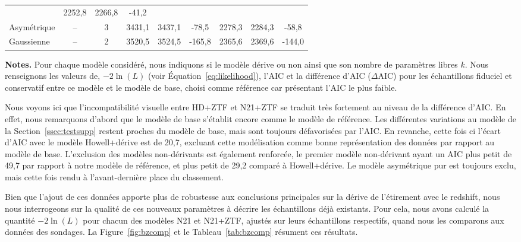 \documentclass[../main/main.tex]{subfiles}
\begin{document}
\begin{landscape}
\begin{table}[p]
\begin{threeparttable}
{\begin{tabular}{lcccccccc}
            & 2252,8 & 2266,8 & -41,2 \\
            Asymétrique & -- & 3
            & 3431,1 & 3437,1 & -78,5
            & 2278,3 & 2284,3 & -58,8 \\
            Gaussienne & -- & 2
            & 3520,5 & 3524,5 & -165,8
            & 2365,6 & 2369,6 & -144,0 \\
            \bottomrule
        \end{tabular}}
        \begin{tablenotes}[flushleft]
            \item\small \textbf{\hspace{-3.2pt}Notes.} Pour chaque modèle
                considéré, nous indiquons si le modèle dérive ou non ainsi que
                son nombre de paramètres libres $k$. Nous renseignons les
                valeurs de, $-2\ln(L)$ (voir Équation~\ref{eq:likelihood}),
                l'AIC et la différence d'AIC ($\Delta$AIC) pour les échantillons
                fiduciel et conservatif entre ce modèle et le modèle de base,
                choisi comme référence car présentant l'AIC le plus faible.
        \end{tablenotes}
    \end{threeparttable}
\end{table}
\end{landscape}
\restoregeometry

Nous voyons ici que l'incompatibilité visuelle entre HD+ZTF et N21+ZTF se
traduit très fortement au niveau de la différence d'AIC. En effet, nous
remarquons d'abord que le modèle de base s'établit encore comme le modèle de
référence. Les différentes variations au modèle de la
Section~\ref{ssec:testsupp} restent proches du modèle de base, mais sont
toujours défavorisées par l'AIC. En revanche, cette fois ci l'écart d'AIC avec
le modèle Howell+dérive est de 20,7, excluant cette modélisation comme bonne
représentation des données par rapport au modèle de base. L'exclusion des
modèles non-dérivants est également renforcée, le premier modèle non-dérivant
ayant un AIC plus petit de 49,7 par rapport à notre modèle de référence, et plus
petit de 29,2 comparé à Howell+dérive. Le modèle asymétrique pur est toujours
exclu, mais cette fois rendu à l'avant-dernière place du classement.

Bien que l'ajout de ces données apporte plus de robustesse aux conclusions
principales sur la dérive de l'étirement avec le redshift, nous nous
interrogeons sur la qualité de ces nouveaux paramètres à décrire les
échantillons déjà existants. Pour cela, nous avons calculé la quantité
$-2\ln(L)$ pour chacun des modèles N21 et N21+ZTF, ajustés sur leurs
échantillons respectifs, quand nous les comparons aux données des sondages. La
Figure~\ref{fig:bzcomp} et le Tableau~\ref{tab:bzcomp} résument ces résultats.
\end{document}
